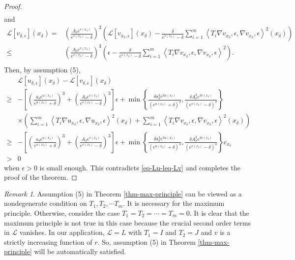 \documentclass[12pt]{amsart}
\def\e{\epsilon}
\def\vv<#1,#2>{\left\langle#1,#2\right\rangle}
\theoremstyle{definition}
\theoremstyle{remark}
\newtheorem{rem}{Remark}
\numberwithin{equation}{section}
\begin{document}
\begin{proof}
\begin{equation}
\begin{split}
\end{split}
\end{equation}
and
\begin{equation}
\begin{split}
\mathscr{L}[v_{\delta,\e}](x_\delta)=&\left(\frac{A_\delta e^{v(x_\delta)}}{e^{v(x_\delta)}-\delta}\right)^3\left(\mathscr{L}[v_{x_\delta,\e}](x_\delta)-\frac{\delta}{e^{v(x_\delta)}-\delta}\sum_{i=1}^m\vv<T_i\nabla v_{x_\delta,\e},\nabla v_{x_\delta,\e}>^2(x_\delta)\right)\\
\leq&\left(\frac{A_\delta e^{v(x_\delta)}}{e^{v(x_\delta)}-\delta}\right)^3\left(\e-\frac{\delta}{e^{v(x_\delta)}-\delta}\sum_{i=1}^m\vv<T_i\nabla v_{x_\delta,\e},\nabla v_{x_\delta,\e}>^2\right).\\
\end{split}
\end{equation}
Then, by assumption (5),
\begin{equation}
\begin{split}
&\mathscr{L}[u_{\delta,\e}](x_\delta)-\mathscr{L}[v_{\delta,\e}](x_\delta)\\
\geq&-\left[\left(\frac{a_\delta e^{u(x_\delta)}}{e^{u(x_\delta)}+\delta}\right)^3+\left(\frac{A_\delta e^{v(x_\delta)}}{e^{v(x_\delta)}-\delta}\right)^3\right]\e+\min\left\{\frac{\delta a_\delta^3 e^{3u(x_\delta)}}{(e^{u(x_\delta)}+\delta)^4},\frac{\delta A_\delta^3 e^{3v(x_\delta)}}{(e^{v(x_\delta)}-\delta)^4}\right\}\\
&\times\left(\sum_{i=1}^m\vv<T_i\nabla u_{x_\delta,\e},\nabla u_{x_\delta,\e}>^2(x_\delta)+\sum_{i=1}^m\vv<T_i\nabla v_{x_\delta,\e},\nabla v_{x_\delta,\e}>^2(x_\delta)\right)\\
\geq&-\left[\left(\frac{a_\delta e^{u(x_\delta)}}{e^{u(x_\delta)}+\delta}\right)^3+\left(\frac{A_\delta e^{v(x_\delta)}}{e^{v(x_\delta)}-\delta}\right)^3\right]\e+\min\left\{\frac{\delta a_\delta^3 e^{3u(x_\delta)}}{(e^{u(x_\delta)}+\delta)^4},\frac{\delta A_\delta^3 e^{3v(x_\delta)}}{(e^{v(x_\delta)}-\delta)^4}\right\}c_{x_\delta}\\
>&0
\end{split}
\end{equation}
when $\epsilon>0$ is small enough. This contradicts \eqref{eq-Lu-leq-Lv} and completes the proof of the theorem.
\end{proof}
\begin{rem}
Assumption (5) in Theorem \ref{thm-max-principle} can be viewed as a nondegenerate condition on $T_1,T_2,\cdots T_m$. It is necessary for the maximum principle. Otherwise, consider the case $T_1=T_2=\cdots=T_m=0$. It is clear that the maximum principle is not true in this case because the crucial second order terms in $\mathscr{L}$ vanishes. In our application, $\mathscr{L}=L$ with $T_1=I$ and $T_2=J$ and $v$ is a strictly increasing function of $r$. So, assumption (5) in Theorem \ref{thm-max-principle} will be automatically satisfied.
\end{rem}
\end{document}
